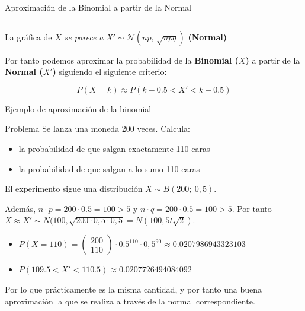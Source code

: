 \documentclass[11pt,handout]{beamer}
\begin{document}
\begin{frame}{Aproximación de la Binomial a partir de la Normal}
\begin{block}
\begin{columns}
\begin{column}{0.6\textwidth}
\end{column}
\end{columns}
La gráfica de $X$ \emph{se parece a} $X' \sim \mathcal{N}(np,\,\sqrt{npq})$ \textbf{(Normal)}
\end{block}

Por tanto podemos aproximar la probabilidad de la \textbf{Binomial ($X$)} a partir de la \textbf{Normal ($X'$)} siguiendo el siguiente criterio:


$$\boxed{P(X=k)\approx P(k-0.5<X'<k+0.5)}$$

\end{frame}

\begin{frame}{Ejemplo de aproximación de la binomial}
\begin{block}{Problema}
Se lanza una moneda 200 veces. Calcula:
\begin{itemize}
\item la probabilidad de que salgan exactamente 110 caras
\item la probabilidad de que salgan a lo sumo 110 caras
\end{itemize} 
\end{block}
El experimento sigue una distribución $X \sim B(200;\  0,5)$.

Además, $n\cdot p=200\cdot 0.5 =100 > 5$ y $n\cdot q=200\cdot 0.5 =100 > 5$. Por tanto $X \approx X'\sim N(100, \sqrt{200\cdot 0,5 \cdot 0,5}=N(100, 5t\sqrt{2})$.

\begin{itemize}
\item $P(X=110)=\begin{pmatrix} 200 \\ 110 \end{pmatrix}\cdot 0.5^{110} \cdot 0,5^{90}\approx 0.0207986943323103$
\item $P(109.5<X'<110.5)\approx 0.0207726494084092$
\end{itemize} 

Por lo que prácticamente es la misma cantidad, y por tanto una buena aproximación la que se realiza a través de la normal correspondiente.

\end{frame}
\end{document}
